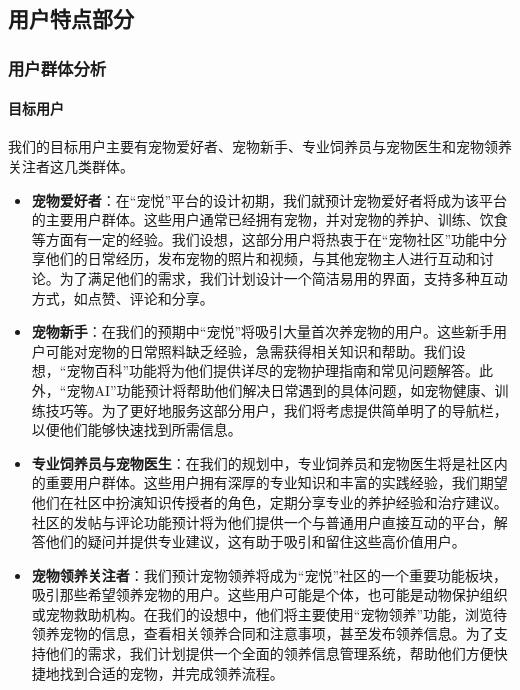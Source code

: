 \subsection{用户特点部分}

\subsubsection{用户群体分析}

\paragraph{目标用户}

我们的目标用户主要有宠物爱好者、宠物新手、专业饲养员与宠物医生和宠物领养关注者这几类群体。

\begin{itemize}
	\item \textbf{宠物爱好者}：在“宠悦”平台的设计初期，我们就预计宠物爱好者将成为该平台的主要用户群体。这些用户通常已经拥有宠物，并对宠物的养护、训练、饮食等方面有一定的经验。我们设想，这部分用户将热衷于在“宠物社区”功能中分享他们的日常经历，发布宠物的照片和视频，与其他宠物主人进行互动和讨论。为了满足他们的需求，我们计划设计一个简洁易用的界面，支持多种互动方式，如点赞、评论和分享。
	\item \textbf{宠物新手}：在我们的预期中“宠悦”将吸引大量首次养宠物的用户。这些新手用户可能对宠物的日常照料缺乏经验，急需获得相关知识和帮助。我们设想，“宠物百科”功能将为他们提供详尽的宠物护理指南和常见问题解答。此外，“宠物AI”功能预计将帮助他们解决日常遇到的具体问题，如宠物健康、训练技巧等。为了更好地服务这部分用户，我们将考虑提供简单明了的导航栏，以便他们能够快速找到所需信息。
	\item \textbf{专业饲养员与宠物医生}：在我们的规划中，专业饲养员和宠物医生将是社区内的重要用户群体。这些用户拥有深厚的专业知识和丰富的实践经验，我们期望他们在社区中扮演知识传授者的角色，定期分享专业的养护经验和治疗建议。社区的发帖与评论功能预计将为他们提供一个与普通用户直接互动的平台，解答他们的疑问并提供专业建议，这有助于吸引和留住这些高价值用户。
	\item\textbf{宠物领养关注者}：我们预计宠物领养将成为“宠悦”社区的一个重要功能板块，吸引那些希望领养宠物的用户。这些用户可能是个体，也可能是动物保护组织或宠物救助机构。在我们的设想中，他们将主要使用“宠物领养”功能，浏览待领养宠物的信息，查看相关领养合同和注意事项，甚至发布领养信息。为了支持他们的需求，我们计划提供一个全面的领养信息管理系统，帮助他们方便快捷地找到合适的宠物，并完成领养流程。
\end{itemize}

